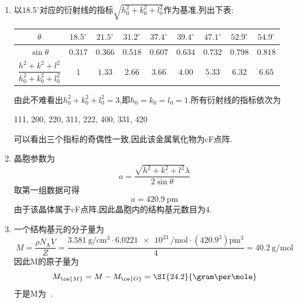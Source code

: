 \documentclass{ctexart}
\begin{document}
\begin{solution}
    \begin{enumerate}[label=\tbf{(\alph*)}]
        \item 以$18.5^\circ$对应的衍射线的指标$\sqrt{h_0^2+k_0^2+l_0^2}$作为基准,列出下表:
        \begin{table}[H]\centering
            \begin{tabular}{|c|c|c|c|c|c|c|c|c|}\hline
               $\theta$ & $18.5^\circ$ & $21.5^\circ$ & $31.2^\circ$ & $37.4^\circ$ & $39.4^\circ$ & $47.1^\circ$ & $52.9^\circ$ & $54.9^\circ$ \\\hline
               $\sin\theta$ & $0.317$ & $0.366$ & $0.518$ & $0.607$ & $0.634$ & $0.732$ & $0.798$ & $0.818$ \\\hline
               $\dfrac{h^2+k^2+l^2}{h_0^2+k_0^2+l_0^2}$ & $1$ & $1.33$ & $2.66$ & $3.66$ & $4.00$ & $5.33$ & $6.32$ & $6.65$\\\hline
            \end{tabular}
        \end{table}
        由此不难看出$h_0^2+k_0^2+l_0^2=3$,即$h_0=k_0=l_0=1$.所有衍射线的指标依次为
        \begin{center}
            111, 200, 220, 311, 222, 400, 331, 420
        \end{center}
        可以看出三个指标的奇偶性一致,因此该金属氧化物为cF点阵.
        \item 晶胞参数为
        \[a=\dfrac{\sqrt{h^2+k^2+l^2}\lambda}{2\sin\theta}\]
        取第一组数据可得
        \[a=\SI{420.9}{\pico\meter}\]
        由于该晶体属于cF点阵,因此晶胞内的结构基元数目为$4$.
        \item 一个结构基元的分子量为
        \[M=\dfrac{\rho N_{\text{A}}V}{Z}=\dfrac{\SI{3.581}{\gram\per\centi\meter^3}\cdot\SI{6.0221e23}{\per\mole}\cdot(420.9^3)\si{\pico\meter^3}}{4}=\SI{40.2}{\gram\per\mole}\]
        因此M的原子量为
        \[M_{\ce{M}}=M-M_{\ce{O}}=\SI{24.2}{\gram\per\mole}\]
        于是M为~.
    \end{enumerate}
\end{solution}
\end{document}

